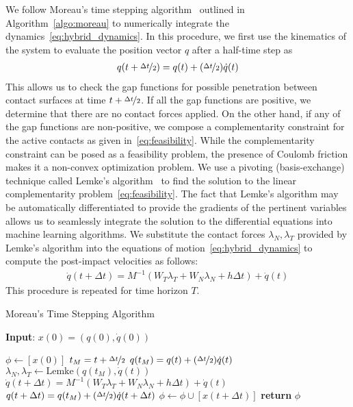 {We follow Moreau's time stepping algorithm~\cite{glocker2005formulation}
outlined in Algorithm~\eqref{algo:moreau} to numerically integrate the
dynamics~\eqref{eq:hybrid_dynamics}. 
%
In this procedure, we first use the kinematics of the system to evaluate the
position vector $q$ after a half-time step as
\begin{align*}
  q(t+\nicefrac{\Delta t}{2}) = q(t) +  (\nicefrac{\Delta t}{2}) \dot{q}(t) 
\end{align*}
%
This allows us to check the gap functions for possible penetration between
contact surfaces at time $t+\nicefrac{\Delta t}{2}$.
%
If all the gap functions are positive, we determine that there are no
contact forces applied.
%
On the other hand, if any of the gap functions are non-positive, we compose a
complementarity constraint for the active contacts as given
in~\eqref{eq:feasibility}.
%
While the complementarity constraint can be posed as a feasibility problem, the
presence of Coulomb friction makes it a non-convex optimization problem. 
%
We use a pivoting (basis-exchange) technique called Lemke's
algorithm~\cite{acary2008numerical} to find the solution to the linear
complementarity problem~\eqref{eq:feasibility}. The fact that Lemke's algorithm
may be automatically differentiated to provide the gradients of the pertinent
variables allows us to seamlessly integrate the solution to the differential
equations into machine learning algorithms.
%
We substitute the contact forces $\lambda_N, \lambda_T$ provided by Lemke's
algorithm into the equations of motion~\eqref{eq:hybrid_dynamics} to compute the
post-impact velocities as follows:
\begin{align*}
  \dot{q}(t+\Delta t) = M^{-1}(W_T \lambda_T + W_N \lambda_N + h\Delta t) + \dot{q}(t)
\end{align*}
%
This procedure is repeated for time horizon $T$.
}
\begin{algorithm}[H]
    \caption{Moreau's Time Stepping Algorithm}
    \label{algo:moreau}
    \small
    \hspace*{\algorithmicindent} \textbf{Input}: $x(0) = (q(0), \dot{q}(0))$
    \begin{algorithmic}[1]
      \State $\phi \leftarrow  [x(0)]$ 
           
            \State $t_M = t + \nicefrac{\Delta t}{2}$
            \State $q(t_M) = q(t) +  (\nicefrac{\Delta t}{2}) \dot{q}(t) $
            \State $\lambda_N, \lambda_T \leftarrow \text{Lemke}(q(t_M), \dot{q}(t))$ 
            \State $\dot{q}(t+\Delta t) = M^{-1}(W_T \lambda_T + W_N \lambda_N + h\Delta t) + \dot{q}(t)$
            \State $q(t + \Delta t) =  q(t_M) +  (\nicefrac{\Delta t}{2})\dot{q}(t+\Delta t)$
            \State $\phi \leftarrow \phi \cup [x(t+\Delta t)]$
          \EndFor
        \State \textbf{return} $\phi$
    \end{algorithmic}
\end{algorithm}
%

